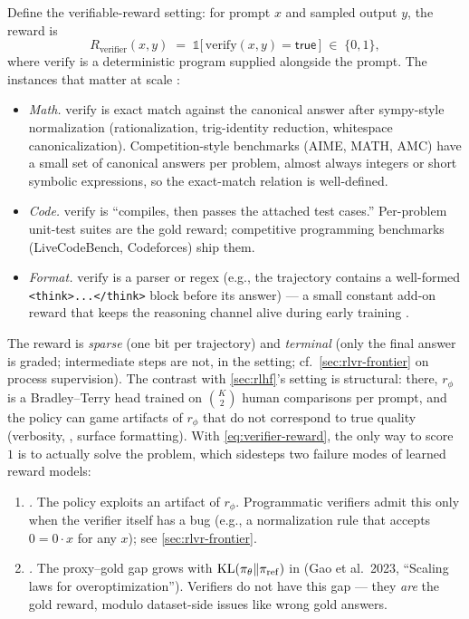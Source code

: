 Define the verifiable-reward setting: for prompt $x$ and sampled output
$y$, the reward is
\begin{equation}
R_{\mathrm{verifier}}(x, y) \;=\; \mathbb{1}\big[\,\mathrm{verify}(x, y) = \mathsf{true}\,\big] \;\in\; \{0, 1\},
\label{eq:verifier-reward}
\end{equation}
where $\mathrm{verify}$ is a deterministic program supplied alongside
the prompt. The instances that matter at scale
\citep[\S 2.2]{deepseek-r1}:

\begin{itemize}
\item \emph{Math.} $\mathrm{verify}$ is exact match against the canonical
answer after sympy-style normalization (rationalization,
trig-identity reduction, whitespace canonicalization). Competition-style
benchmarks (AIME, MATH, AMC) have a small set of canonical answers per
problem, almost always integers or short symbolic expressions, so the
exact-match relation is well-defined.
\item \emph{Code.} $\mathrm{verify}$ is ``compiles, then passes the
attached test cases.'' Per-problem unit-test suites are the gold reward;
competitive programming benchmarks (LiveCodeBench, Codeforces) ship
them.
\item \emph{Format.} $\mathrm{verify}$ is a parser or regex (e.g., the
trajectory contains a well-formed
\texttt{<think>...</think>} block before its answer) — a small constant
add-on reward that keeps the reasoning channel alive during early
training \citep[\S 2.2]{deepseek-r1}.
\end{itemize}

The reward is \emph{sparse} (one bit per trajectory) and \emph{terminal}
(only the final answer is graded; intermediate steps are not, in the
 setting; cf.\ \cref{sec:rlvr-frontier} on process supervision). The
contrast with \cref{sec:rlhf}'s  setting is structural: there,
$r_\phi$ is a Bradley--Terry head trained on $\binom{K}{2}$ human
comparisons per prompt, and the policy can game artifacts of $r_\phi$
that do not correspond to true quality (verbosity, , surface
formatting). With \cref{eq:verifier-reward}, the only way to score $1$
is to actually solve the problem, which sidesteps two failure modes of
learned reward models:

\begin{enumerate}
\item \emph{.} The policy exploits an artifact of
$r_\phi$. Programmatic verifiers admit this only when the verifier
itself has a bug (e.g., a normalization rule that accepts
$0 = 0\cdot x$ for any $x$); see \cref{sec:rlvr-frontier}.
\item \emph{.} The proxy--gold gap grows with
$\operatorname{KL}(\pi_\theta \| \pi_{\mathrm{ref}})$ in  (Gao et al.\ 2023,
``Scaling laws for  overoptimization'').
 Verifiers do not have this gap — they
\emph{are} the gold reward, modulo dataset-side issues like wrong gold
answers.
\end{enumerate}

